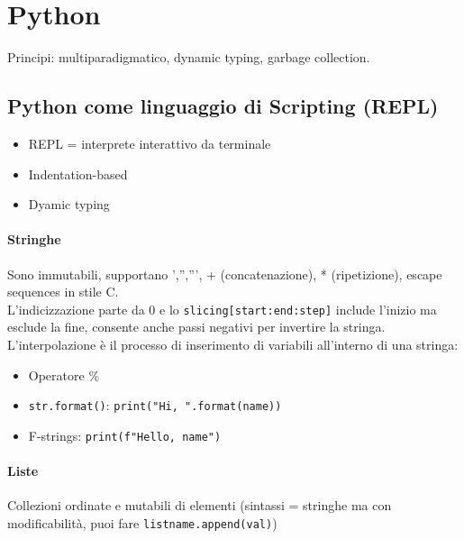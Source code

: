 \documentclass[12pt]{extarticle}
\begin{document}
\newpage
\section{Python}
Principi: multiparadigmatico, dynamic typing, garbage collection.

\subsection{Python come linguaggio di Scripting (REPL)}
\begin{itemize}
    \item REPL = interprete interattivo da terminale
    \item Indentation-based
    \item Dyamic typing
\end{itemize}

\paragraph{Stringhe} Sono immutabili, supportano ','',''', + (concatenazione), * (ripetizione), escape sequences in stile C.\\

\noindent L'indicizzazione parte da 0 e lo \texttt{slicing[start:end:step]} include l'inizio ma esclude la fine, consente anche passi negativi per invertire la stringa.\\

\noindent L'interpolazione è il processo di inserimento di variabili all'interno di una stringa:
\begin{itemize}
    \item Operatore \%
    \item \texttt{str.format()}: \texttt{print("Hi, {}".format(name))}
    \item F-strings: \texttt{print(f"Hello, {name}")}
\end{itemize}

\paragraph{Liste} Collezioni ordinate e mutabili di elementi (sintassi = stringhe ma con modificabilità, puoi fare \texttt{listname.append(val)})
\end{document}
